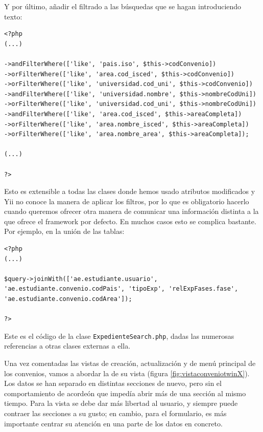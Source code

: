 Y por último, añadir el filtrado a las búsquedas que se hagan introduciendo texto:

\begin{verbatim}
<?php
(...)

->andFilterWhere(['like', 'pais.iso', $this->codConvenio])
->orFilterWhere(['like', 'area.cod_isced', $this->codConvenio])
->orFilterWhere(['like', 'universidad.cod_uni', $this->codConvenio])
->andFilterWhere(['like', 'universidad.nombre', $this->nombreCodUni])
->orFilterWhere(['like', 'universidad.cod_uni', $this->nombreCodUni])
->andFilterWhere(['like', 'area.cod_isced', $this->areaCompleta])
->orFilterWhere(['like', 'area.nombre_isced', $this->areaCompleta])
->orFilterWhere(['like', 'area.nombre_area', $this->areaCompleta]);

(...)

?>
\end{verbatim}

Esto es extensible a todas las clases donde hemos usado atributos modificados y Yii no conoce la manera de aplicar los filtros, por lo que es obligatorio hacerlo cuando queremos ofrecer otra manera de comunicar una información distinta a la que ofrece el framework por defecto. En muchos casos esto se complica bastante. Por ejemplo, en la unión de las tablas:

\begin{verbatim}
<?php
(...)

$query->joinWith(['ae.estudiante.usuario', 'ae.estudiante.convenio.codPais', 'tipoExp', 'relExpFases.fase', 'ae.estudiante.convenio.codArea']);

?>
\end{verbatim}

Este es el código de la clase \texttt{ExpedienteSearch.php}, dadas las numerosas referencias a otras clases externas a ella.

Una vez comentadas las vistas de creación, actualización y de menú principal de los convenios, vamos a abordar la de su vista (figura \ref{fig:vistaconveniotwinX}). Los datos se han separado en distintas secciones de nuevo, pero sin el comportamiento de acordeón que impedía abrir más de una sección al mismo tiempo. Para la vista se debe dar más libertad al usuario, y siempre puede contraer las secciones a su gusto; en cambio, para el formulario, es más importante centrar su atención en una parte de los datos en concreto.

